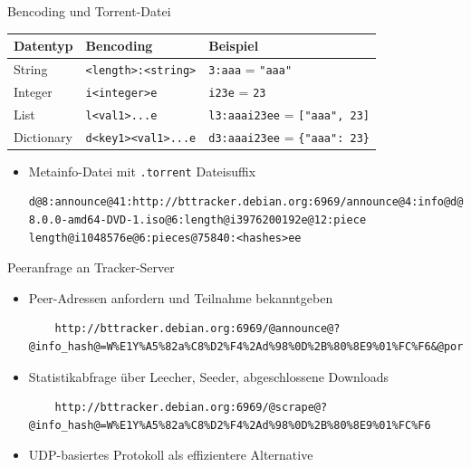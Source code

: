 \documentclass[dvipsnames]{beamer} %
\begin{document}
	\begin{frame}[fragile]{Bencoding und Torrent-Datei}
		\begin{center}
			\begin{tabular}{lll}
				\toprule
				Datentyp & Bencoding & Beispiel \\
				\midrule
				String & \texttt{<length>:<string>} & \texttt{3:aaa} = \texttt{"aaa"} \\
				Integer & \texttt{i<integer>e} & \texttt{i23e} = \texttt{23} \\
				List & \texttt{l<val1>...e} & \texttt{l3:aaai23ee} = \texttt{["aaa", 23]} \\
				Dictionary & \texttt{d<key1><val1>...e} & \texttt{d3:aaai23ee} = \texttt{\{"aaa": 23\}} \\
				\bottomrule
			\end{tabular}
		\end{center}

		\pause
		\begin{itemize}
			\item Metainfo-Datei mit \texttt{.torrent} Dateisuffix
			\begin{lstlisting}
d@8:announce@41:http://bttracker.debian.org:6969/announce@4:info@d@4:name@28:debian-8.0.0-amd64-DVD-1.iso@6:length@i3976200192e@12:piece length@i1048576e@6:pieces@75840:<hashes>ee
			\end{lstlisting}
		\end{itemize}
	\end{frame}

	\begin{frame}[fragile]{Peeranfrage an Tracker-Server}
		\begin{itemize}
			\item Peer-Adressen anfordern und Teilnahme bekanntgeben
				\begin{lstlisting}
	http://bttracker.debian.org:6969/@announce@?@info_hash@=W%E1Y%A5%82a%C8%D2%F4%2Ad%98%0D%2B%80%8E9%01%FC%F6&@port@=6881&@peer_id@=hNsfr5PYlFtWO73yvSGX&@event@=started&@downloaded@=1896&@left@=1896&@uploaded@=758
				\end{lstlisting}
			\pause
			\item Statistikabfrage über Leecher, Seeder, abgeschlossene Downloads
				\begin{lstlisting}
	http://bttracker.debian.org:6969/@scrape@?@info_hash@=W%E1Y%A5%82a%C8%D2%F4%2Ad%98%0D%2B%80%8E9%01%FC%F6
				\end{lstlisting}
			\pause
			\item UDP-basiertes Protokoll als effizientere Alternative
		\end{itemize}
	\end{frame}
\end{document}
